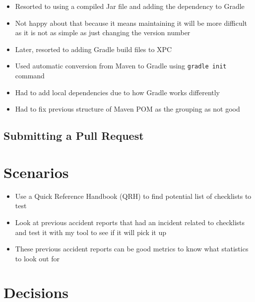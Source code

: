 \documentclass[../dissertation.tex]{subfiles}
\begin{document}
\begin{itemize}
\item Resorted to using a compiled Jar file and adding the dependency to Gradle
\item Not happy about that because it means maintaining it will be more difficult as
  it is not as simple as just changing the version number
\item Later, resorted to adding Gradle build files to XPC
\item Used automatic conversion from Maven to Gradle using \verb|gradle init| command~\cite{gradle:migratePOM}
\item Had to add local dependencies due to how Gradle works differently
\item Had to fix previous structure of Maven POM as the grouping as not good
\end{itemize}


\subsection{Submitting a Pull Request}




\section{Scenarios}
\begin{itemize}
  \item Use a Quick Reference Handbook (QRH) to find potential list of checklists to test
  \item Look at previous accident reports that had an incident related to checklists
    and test it with my tool to see if it will pick it up
  \item These previous accident reports can be good metrics to know what statistics to
    look out for
\end{itemize}


\section{Decisions}
\end{document}
